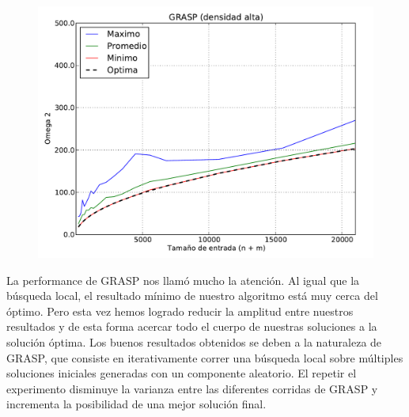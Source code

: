 \begin{figure}[H]
\begin{center}
\includegraphics[angle=0, scale=.70]{imagenes/calidad_grasp_2014-06-27_08-54-46.pdf}
\label{grafico local}
\end{center}
\end{figure}

\newpage
La performance de GRASP nos llamó mucho la atención. Al igual que la búsqueda local, el resultado mínimo de nuestro algoritmo está muy cerca del
óptimo. Pero esta vez hemos logrado reducir la amplitud entre nuestros resultados y de esta forma acercar todo el cuerpo de nuestras soluciones
a la solución óptima.
Los buenos resultados obtenidos se deben a la naturaleza de GRASP, que consiste en iterativamente correr una búsqueda local sobre múltiples
soluciones iniciales generadas con un componente aleatorio. El repetir el experimento disminuye la varianza entre las diferentes corridas de GRASP y incrementa la posibilidad de una mejor solución
final.
